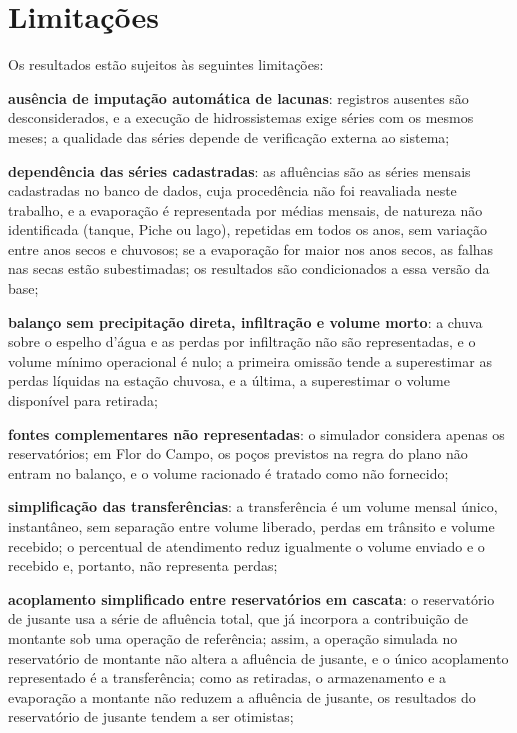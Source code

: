 \section{Limitações}
\label{sec:limitacoes}

Os resultados estão sujeitos às seguintes limitações:

\begin{alineas}
    \item \textbf{ausência de imputação automática de lacunas}: registros ausentes são desconsiderados, e a execução de hidrossistemas exige séries com os mesmos meses; a qualidade das séries depende de verificação externa ao sistema;
    \item \textbf{dependência das séries cadastradas}: as afluências são as séries mensais cadastradas no banco de dados, cuja procedência não foi reavaliada neste trabalho, e a evaporação é representada por médias mensais, de natureza não identificada (tanque, Piche ou lago), repetidas em todos os anos, sem variação entre anos secos e chuvosos; se a evaporação for maior nos anos secos, as falhas nas secas estão subestimadas; os resultados são condicionados a essa versão da base;
    \item \textbf{balanço sem precipitação direta, infiltração e volume morto}: a chuva sobre o espelho d'água e as perdas por infiltração não são representadas, e o volume mínimo operacional é nulo; a primeira omissão tende a superestimar as perdas líquidas na estação chuvosa, e a última, a superestimar o volume disponível para retirada;
    \item \textbf{fontes complementares não representadas}: o simulador considera apenas os reservatórios; em Flor do Campo, os poços previstos na regra do plano não entram no balanço, e o volume racionado é tratado como não fornecido;
    \item \textbf{simplificação das transferências}: a transferência é um volume mensal único, instantâneo, sem separação entre volume liberado, perdas em trânsito e volume recebido; o percentual de atendimento reduz igualmente o volume enviado e o recebido e, portanto, não representa perdas;
    \item \textbf{acoplamento simplificado entre reservatórios em cascata}: o reservatório de jusante usa a série de afluência total, que já incorpora a contribuição de montante sob uma operação de referência; assim, a operação simulada no reservatório de montante não altera a afluência de jusante, e o único acoplamento representado é a transferência; como as retiradas, o armazenamento e a evaporação a montante não reduzem a afluência de jusante, os resultados do reservatório de jusante tendem a ser otimistas;

\end{alineas}
